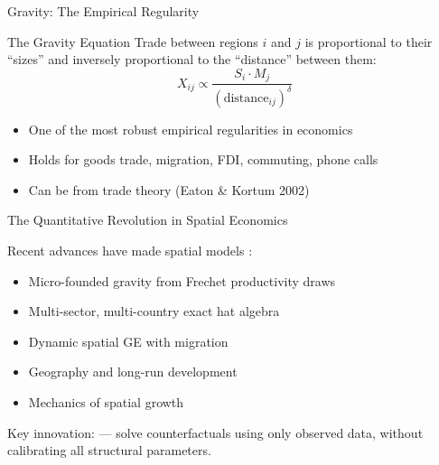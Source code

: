 \documentclass{beamer}
\begin{document}
\begin{frame}{Gravity: The Empirical Regularity}

    \begin{exampleblock}{The Gravity Equation}
        Trade between regions $i$ and $j$ is proportional to their ``sizes'' and inversely proportional to the ``distance'' between them:
        \[ X_{ij} \propto \frac{S_i \cdot M_j}{(\text{distance}_{ij})^\delta} \]
    \end{exampleblock}

    \vspace{0.5em}
    \begin{itemize}
        \item One of the most robust empirical regularities in economics
        \item Holds for goods trade, migration, FDI, commuting, phone calls
        \item Can be  from trade theory (Eaton \& Kortum 2002)
    \end{itemize}

    \vspace{0.5em}

\end{frame}

\begin{frame}{The Quantitative Revolution in Spatial Economics}

    Recent advances have made spatial models :

    \vspace{0.5em}
    \begin{itemize}
        \item {} Micro-founded gravity from Frechet productivity draws
        \item {} Multi-sector, multi-country exact hat algebra
        \item {} Dynamic spatial GE with migration
        \item {} Geography and long-run development
        \item {} Mechanics of spatial growth
    \end{itemize}

    \vspace{0.5em}
    Key innovation:  --- solve counterfactuals using only observed data, without calibrating all structural parameters.

\end{frame}
\end{document}
